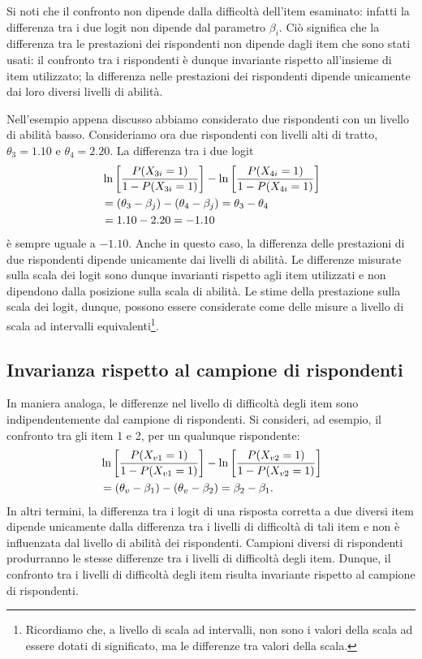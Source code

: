 Si noti che il confronto non dipende dalla difficoltà dell'item esaminato: infatti la differenza tra i due logit non dipende dal parametro $\beta_i$.  Ciò significa che la differenza tra le prestazioni dei rispondenti non dipende dagli item che sono stati usati: il confronto tra i rispondenti è dunque invariante rispetto all'insieme di item utilizzato; la differenza nelle prestazioni dei rispondenti dipende unicamente dai loro diversi livelli di abilità.

Nell'esempio appena discusso abbiamo considerato due rispondenti con un livello di abilità basso. Consideriamo ora due rispondenti con livelli alti di tratto,  $\theta_3=1.10$ e  $\theta_4=2.20$. La differenza tra i due logit 
\begin{align}
&\ln \left[\frac{P(X_{3i}=1)}{1-P(X_{3i}=1)}\right] - \ln \left[ \frac{P(X_{4i}=1)}{1-P(X_{4i}=1)}\right]\notag\\
&=(\theta_3-\beta_j)-(\theta_4-\beta_j)=\theta_3-\theta_4\notag\\
&=1.10-2.20=-1.10\notag
\end{align}
\noindent
è sempre uguale a $-1.10$. Anche in questo caso, la differenza delle prestazioni di due rispondenti dipende unicamente dai livelli di abilità. Le differenze misurate sulla scala dei logit sono dunque invarianti rispetto agli item utilizzati e non dipendono dalla posizione sulla scala di abilità. Le stime della prestazione sulla scala dei logit, dunque, possono essere considerate come delle misure a livello di scala ad intervalli equivalenti\footnote{Ricordiamo che, a livello di scala ad intervalli, non sono i valori della scala ad essere dotati di significato, ma le differenze tra valori della scala.}. 

\subsection{Invarianza rispetto al campione di rispondenti}

In maniera analoga, le differenze nel livello di difficoltà degli item sono indipendentemente dal campione di rispondenti.  Si consideri, ad esempio, il confronto tra gli item 1 e 2, per un qualunque rispondente:
\begin{align}
&\ln \left[\frac{P(X_{v1}=1)}{1-P(X_{v1}=1)}\right] - \ln \left[ \frac{P(X_{v2}=1)}{1-P(X_{v2}=1)} \right] \notag\\
&=(\theta_v-\beta_1)-(\theta_v-\beta_2) =\beta_2-\beta_1.\notag
\end{align}
In altri termini, la differenza tra i logit di una risposta corretta a due diversi item dipende unicamente dalla differenza tra i livelli di difficoltà di tali item e non è influenzata dal livello di abilità dei rispondenti. Campioni diversi di rispondenti produrranno le stesse differenze tra i livelli di difficoltà degli item. Dunque, il confronto tra i livelli di difficoltà degli item risulta invariante rispetto al campione di rispondenti.  

